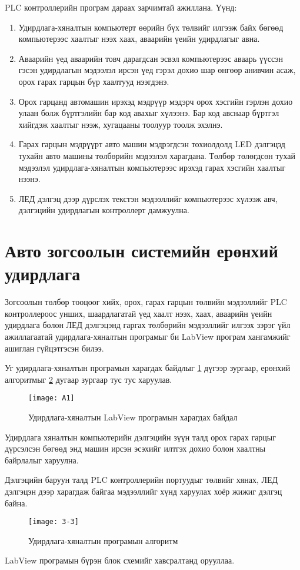 PLC контроллерийн програм дараах зарчимтай ажиллана. Үүнд: 
\begin{enumerate}
\item Удирдлага-хяналтын компьютерт өөрийн бүх төлвийг илгээж байх бөгөөд компьютерээс хаалтыг нээх хаах, аваарийн үеийн удирдлагыг авна.
\item Аваарийн үед аваарийн товч дарагдсан эсвэл компьютерээс аваарь үүссэн гэсэн удирдлагын мэдээлэл ирсэн үед гэрэл дохио шар өнгөөр анивчин асаж, орох гарах гарцын бүр хаалтууд нээгдэнэ. 
\item Орох гарцанд автомашин ирэхэд мэдрүүр мэдэрч орох хэсгийн гэрлэн дохио улаан болж бүртгэлийн бар код авахыг хүлээнэ. Бар код авснаар бүртгэл хийгдэж хаалтыг нээж, хугацааны тоолуур тоолж эхэлнэ. 
\item Гарах гарцын мэдрүүрт авто машин мэдрэгдсэн тохиолдолд LED дэлгэцэд тухайн авто машины төлбөрийн мэдээлэл харагдана. Төлбөр төлөгдсөн тухай мэдээлэл удирдлага-хяналтын компьютерээс ирэхэд гарах хэсгийн хаалтыг нээнэ. 
\item ЛЕД дэлгэц дээр дүрслэх текстэн мэдээллийг компьютерээс хүлээж авч, дэлгэцийн удирдлагын контроллерт дамжуулна.  
\end{enumerate}

\section{Авто зогсоолын системийн ерөнхий удирдлага}
Зогсоолын төлбөр тооцоог хийх, орох, гарах гарцын төлвийн мэдээллийг PLC контроллероос унших, шаардлагатай үед хаалт нээх, хаах, аваарийн үеийн удирдлага болон ЛЕД дэлгэцэнд гаргах төлбөрийн мэдээллийг илгээх зэрэг үйл ажиллагаатай удирдлага-хяналтын програмыг би LabView програм хангамжийг ашиглан гүйцэтгэсэн билээ. 

Уг удирдлага-хяналтын програмын харагдах байдлыг \ref{fig:3-8} дүгээр зургаар, ерөнхий алгоритмыг \ref{fig:3-9} дугаар зургаар тус тус харуулав. 
 \begin{figure}[!ht]
	\centering
	\texttt{[image: A1]}
	\caption{Удирдлага-хяналтын LabView програмын харагдах байдал}
	\label{fig:3-8}
\end{figure}

Удирдлага хяналтын компьютерийн дэлгэцийн зүүн талд орох гарах гарцыг дүрсэлсэн бөгөөд энд машин ирсэн эсэхийг илтгэх дохио болон хаалтны байрлалыг харуулна.

Дэлгэцийн баруун талд PLC контроллерийн портуудыг төлвийг хянах, ЛЕД дэлгэцэн дээр харагдаж байгаа мэдээллийг хүнд харуулах хоёр жижиг дэлгэц байна.
 \begin{figure}[!ht]
	\centering
	\texttt{[image: 3-3]}
	\caption{Удирдлага-хяналтын програмын алгоритм}
	\label{fig:3-9}
\end{figure}
LabView програмын бүрэн блок схемийг хавсралтанд орууллаа. 

